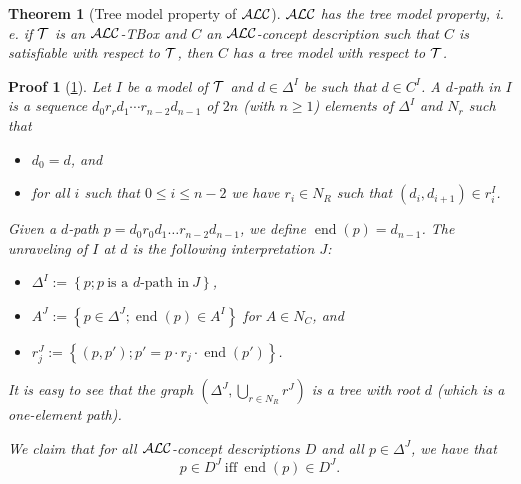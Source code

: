 \documentclass[openany]{scrbook}
\theoremstyle{break}
\newtheorem{Theorem}{Theorem}[chapter]
\theoremstyle{nonumberbreak}
\theoremstyle{nonumberplain}
\theoremstyle{nonumberbreak}
\newtheorem{Proof}{Proof}
\newcommand{\set}[1]{\left\{#1\right\}}
\newcommand{\ie}{i{.}\,e{.}\xspace}
\newcommand{\ALC}{{\cal A}{\cal L}{\cal C}}
\newcommand{\en}{\operatorname{end}}
\begin{document}
\begin{Theorem}[Tree model property of $\ALC$]
  \label{3.7}
  $\ALC$ has the tree model property, \ie if ${\cal T}$ is an
  $\ALC$-TBox and $C$ an $\ALC$-concept description such that $C$ is
  satisfiable with respect to ${\cal T}$, then $C$ has a tree model
  with respect to ${\cal T}$.
\end{Theorem}

\begin{Proof}[\cref{3.7}]
  Let $I$ be a model of ${\cal T}$ and $d \in \Delta^I$ be such that
  $d \in C^I$. A $d$-path in $I$ is a sequence $d_0r_rd_1 \dotsm r_{n
    - 2}d_{n - 1}$ of $2n$ (with $n \geq 1$) elements of $\Delta^I$
  and $N_r$ such that
  \begin{itemize}
    \item $d_0 = d$, and
    \item for all $i$ such that $0 \leq i \leq n - 2$ we have $r_i \in
      N_R$ such that $(d_i, d_{i + 1}) \in r_i^I$.
  \end{itemize}

  Given a $d$-path $p = d_0 r_0 d_1 \dots r_{n - 2} d_{n - 1}$, we
  define $\en(p) = d_{n - 1}$. The unraveling of $I$ at $d$ is the
  following interpretation $J$:
  \begin{itemize}
  \item $\Delta^I := \set{p; p\ \text{is a $d$-path in}\ J}$,
  \item $A^J := \set{p \in \Delta^J; \en(p) \in A^I}$ for $A \in
    N_C$, and
  \item $r_j^J := \set{(p, p'); p' = p \cdot r_j \cdot \en(p')}$.
  \end{itemize}

  It is easy to see that the graph $(\Delta^J, \bigcup_{r \in
    N_R}{r^J})$ is a tree with root $d$ (which is a one-element path).

  We claim that for all $\ALC$-concept descriptions $D$ and all $p \in
  \Delta^J$, we have that
  \begin{equation*}
    p \in D^J\ \text{iff}\ \en(p) \in D^J.
  \end{equation*}


\end{Proof}
\end{document}
